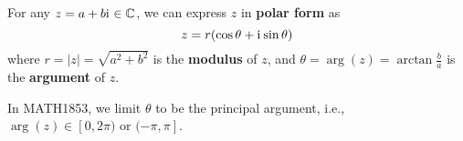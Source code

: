 \begin{definition}
    For any $z=a+b\mathrm{i}\mkern1mu\in\mathbb{C}$, we can express $z$ in \textbf{polar form} as
    \[
        z = r(\cos\theta + \mathrm{i}\mkern1mu\sin\theta)
    \]
    where $r=|z|=\sqrt{a^2+b^2}$ is the \textbf{modulus} of $z$,
    and $\theta=\arg(z)=\arctan\frac{b}{a}$ is the \textbf{argument} of $z$.
\end{definition}

\begin{remark}
    In MATH1853, we limit $\theta$ to be the principal argument, i.e.,
    $\arg(z)\in[0,2\pi)\text{ or }(-\pi,\pi]$.
\end{remark}